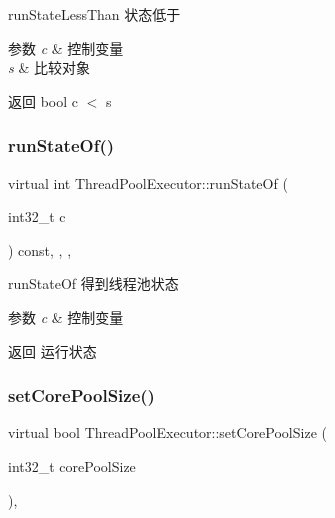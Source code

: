 run\+State\+Less\+Than 状态低于 


\begin{DoxyParams}{参数}
{\em c} & 控制变量 \\
\hline
{\em s} & 比较对象\\
\hline
\end{DoxyParams}
\begin{DoxyReturn}{返回}
bool c $<$ s 
\end{DoxyReturn}
\mbox{\label{classThreadPoolExecutor_acdb626fdcb6ed4c7822508d1e0a3fcf5}} 
\subsubsection{\texorpdfstring{run\+State\+Of()}{runStateOf()}}
{\footnotesize\ttfamily virtual int Thread\+Pool\+Executor\+::run\+State\+Of (\begin{DoxyParamCaption}\item[{int32\+\_\+t}]{c }\end{DoxyParamCaption}) const\hspace{0.3cm}{\ttfamily [inline]}, {\ttfamily [final]}, {\ttfamily [protected]}, {\ttfamily [virtual]}}



run\+State\+Of 得到线程池状态 


\begin{DoxyParams}{参数}
{\em c} & 控制变量\\
\hline
\end{DoxyParams}
\begin{DoxyReturn}{返回}
运行状态 
\end{DoxyReturn}
\mbox{\label{classThreadPoolExecutor_a56311f5d8aefa64b8c67fd9ff89c204c}} 
\subsubsection{\texorpdfstring{set\+Core\+Pool\+Size()}{setCorePoolSize()}}
{\footnotesize\ttfamily virtual bool Thread\+Pool\+Executor\+::set\+Core\+Pool\+Size (\begin{DoxyParamCaption}\item[{int32\+\_\+t}]{core\+Pool\+Size }\end{DoxyParamCaption})\hspace{0.3cm}{\ttfamily [final]}, {\ttfamily [virtual]}}



